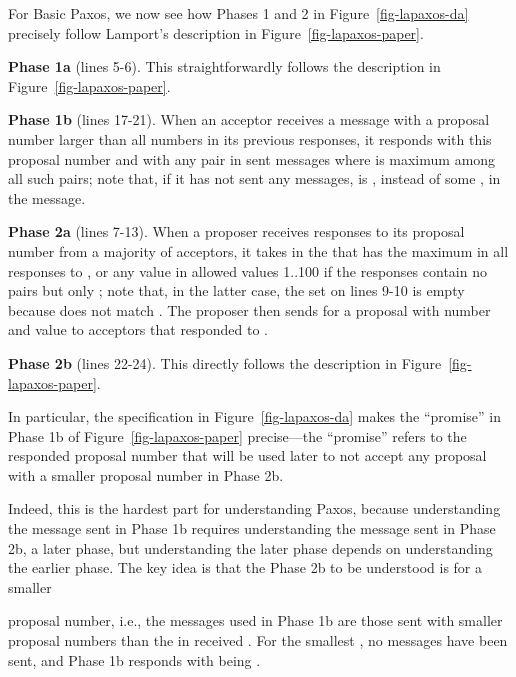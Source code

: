 \documentclass[11pt]{article}
\newcommand{\notes}[1]{} %
\begin{document}
For Basic Paxos, 
we now see how Phases 1 and 2 in Figure~\ref{fig-lapaxos-da} precisely
follow Lamport's description in Figure~\ref{fig-lapaxos-paper}.
\lipics{}
\begin{description}
  \setlength{\itemsep}{0ex}

\item {\bf Phase 1a} (lines 5-6). %
  This straightforwardly follows the description in
  Figure~\ref{fig-lapaxos-paper}.  

\item {\bf Phase 1b} (lines 17-21).  When an acceptor receives a
   message with a proposal number larger than all numbers
  in its previous responses, it responds with this proposal number and
  with any  pair in sent  messages where 
  is maximum among all such pairs; note that, if it has not sent any
   messages,  is , instead of
  some , in the  message.

\item {\bf Phase 2a} (lines 7-13).  When a proposer receives responses
  to %
  its proposal number  from a majority of acceptors, it takes 
  in the  that has the maximum  in all responses to
  , or any value in allowed values 1..100 if the responses contain no
   pairs but only ; note that, in the latter case,
  the set on lines 9-10 is empty because  does not match
  .  The proposer then sends  for a proposal with
  number  and value  to acceptors that responded to .

\item {\bf Phase 2b} (lines 22-24).  This directly follows the
  description in Figure~\ref{fig-lapaxos-paper}.

\end{description}\lipics{}
In particular, the specification in Figure~\ref{fig-lapaxos-da} makes the
``promise'' in Phase 1b of Figure~\ref{fig-lapaxos-paper} precise---the
``promise'' refers to the responded proposal number that will be used later
to not accept any proposal with a smaller proposal number in Phase 2b.

Indeed, this is the hardest part for understanding Paxos, because
understanding the  message sent in Phase 1b requires
understanding the  message sent in Phase 2b, a later
phase, but understanding the later phase depends on understanding the
earlier phase.
The key idea is that the Phase 2b to be understood is for a smaller%
\notes{} 
proposal number, i.e., the  messages used in Phase 1b are
those sent with smaller proposal numbers than the  in received
.  For the smallest , no  messages
have been sent, and Phase 1b responds with  being
.
\end{document}
